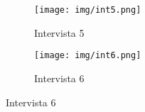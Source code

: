 \documentclass{article}
\begin{document}
\begin{figure}[h]
    \centering
    \begin{subfigure}{0.40\textwidth}
        \centering
        \texttt{[image: img/int5.png]}
        \caption{Intervista 5}
    \end{subfigure}
    \hfill
    \begin{subfigure}{0.40\textwidth}
        \centering
        \texttt{[image: img/int6.png]}
        \caption{Intervista 6}
    \end{subfigure}
\end{figure}
\end{document}
